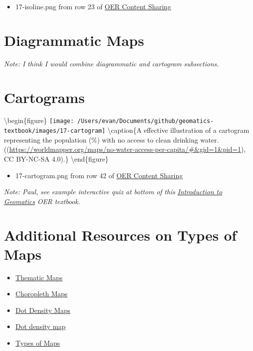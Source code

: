 \documentclass[
]{book}
\providecommand{\tightlist}{%
  \setlength{\itemsep}{0pt}\setlength{\parskip}{0pt}}
\begin{document}
\begin{itemize}
\tightlist
\item
  17-isoline.png from row 23 of \href{https://docs.google.com/spreadsheets/d/1LqzXn00wMeIjHWstNT3tMImNDZirLGc3g72jFOQc_8I/edit\#gid=817407192}{OER Content Sharing}
\end{itemize}

\hypertarget{diagrammatic-maps}{%
\section{Diagrammatic Maps}\label{diagrammatic-maps}}

\emph{Note: I think I would combine diagrammatic and cartogram subsections.}

\hypertarget{cartograms}{%
\section{Cartograms}\label{cartograms}}

\textbackslash begin\{figure\}
\texttt{[image: /Users/evan/Documents/github/geomatics-textbook/images/17-cartogram]} \textbackslash caption\{A effective illustration of a cartogram representing the population (\%) with no access to clean drinking water. (\citep[ Mapper]{World}(\url{https://worldmapper.org/maps/no-water-access-per-capita/\#\&gid=1\&pid=1}), CC BY-NC-SA 4.0).\}\label{fig:17-cartogram}
\textbackslash end\{figure\}

\begin{itemize}
\tightlist
\item
  17-cartogram.png from row 42 of \href{https://docs.google.com/spreadsheets/d/1LqzXn00wMeIjHWstNT3tMImNDZirLGc3g72jFOQc_8I/edit\#gid=817407192}{OER Content Sharing}
\end{itemize}

\emph{Note: Paul, see example interactive quiz at bottom of this \href{https://openpress.usask.ca/introgeomatics/chapter/thematic-maps/}{Introduction to Geomatics} OER textbook.}

\hypertarget{additional-resources-on-types-of-maps}{%
\section{Additional Resources on Types of Maps}\label{additional-resources-on-types-of-maps}}

\begin{itemize}
\tightlist
\item
  \href{https://openpress.usask.ca/introgeomatics/chapter/thematic-maps/}{Thematic Maps}
\item
  \href{https://www.axismaps.com/guide/choropleth}{Choropleth Maps}
\item
  \href{https://www.axismaps.com/guide/dot-density}{Dot Density Maps}
\item
  \href{http://wiki.gis.com/wiki/index.php/Dot_density_map}{Dot density map}
\item
  \href{https://www.e-education.psu.edu/geog486/node/641}{Types of Maps}
\end{itemize}
\end{document}
